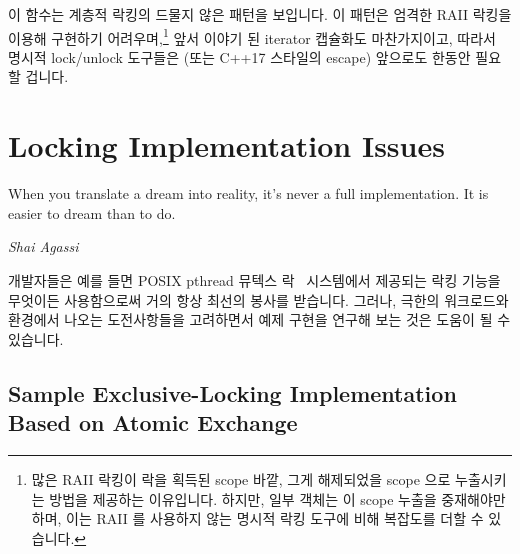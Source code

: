 이 함수는 계층적 락킹의 드물지 않은 패턴을 보입니다.
이 패턴은 엄격한 RAII 락킹을 이용해 구현하기 어려우며,\footnote{
	많은 RAII 락킹이 락을 획득된 scope 바깥, 그게 해제되었을 scope 으로
	누출시키는 방법을 제공하는 이유입니다.
	하지만, 일부 객체는 이 scope 누출을 중재해야만 하며, 이는 RAII 를
	사용하지 않는 명시적 락킹 도구에 비해 복잡도를 더할 수 있습니다.}
앞서 이야기 된 iterator 캡슐화도 마찬가지이고, 따라서 명시적 lock/unlock
도구들은 (또는 C++17 스타일의  escape) 앞으로도 한동안 필요할
겁니다.

\section{Locking Implementation Issues}
\label{sec:locking:Locking Implementation Issues}
%
\epigraph{When you translate a dream into reality, it's never a full
	  implementation.  It is easier to dream than to do.}
	 {\emph{Shai Agassi}}

개발자들은 예를 들면 POSIX pthread 뮤텍스 락~\cite{OpenGroup1997pthreads}
시스템에서 제공되는 락킹 기능을 무엇이든 사용함으로써 거의 항상 최선의 봉사를
받습니다.
그러나, 극한의 워크로드와 환경에서 나오는 도전사항들을 고려하면서 예제 구현을
연구해 보는 것은 도움이 될 수 있습니다.

\subsection{Sample Exclusive-Locking Implementation Based on Atomic Exchange}
\label{sec:locking:Sample Exclusive-Locking Implementation Based on Atomic Exchange}

